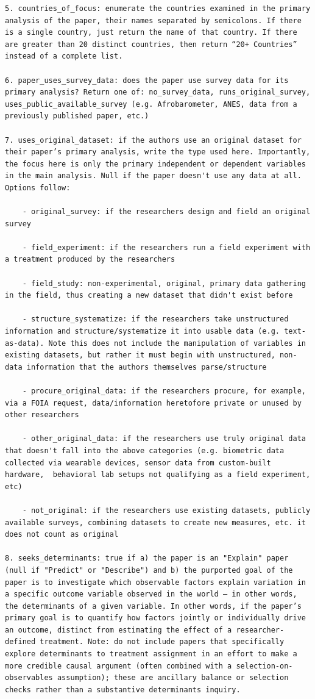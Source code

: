 \documentclass[12pt]{article}
\begin{document}
{\begin{Verbatim}[breaklines=true]
5. countries_of_focus: enumerate the countries examined in the primary analysis of the paper, their names separated by semicolons. If there is a single country, just return the name of that country. If there are greater than 20 distinct countries, then return “20+ Countries” instead of a complete list.

6. paper_uses_survey_data: does the paper use survey data for its primary analysis? Return one of: no_survey_data, runs_original_survey, uses_public_available_survey (e.g. Afrobarometer, ANES, data from a previously published paper, etc.)

7. uses_original_dataset: if the authors use an original dataset for their paper’s primary analysis, write the type used here. Importantly, the focus here is only the primary independent or dependent variables in the main analysis. Null if the paper doesn't use any data at all. Options follow:

    - original_survey: if the researchers design and field an original survey

    - field_experiment: if the researchers run a field experiment with a treatment produced by the researchers

    - field_study: non-experimental, original, primary data gathering in the field, thus creating a new dataset that didn't exist before

    - structure_systematize: if the researchers take unstructured information and structure/systematize it into usable data (e.g. text-as-data). Note this does not include the manipulation of variables in existing datasets, but rather it must begin with unstructured, non-data information that the authors themselves parse/structure

    - procure_original_data: if the researchers procure, for example, via a FOIA request, data/information heretofore private or unused by other researchers

    - other_original_data: if the researchers use truly original data that doesn't fall into the above categories (e.g. biometric data collected via wearable devices, sensor data from custom-built hardware,  behavioral lab setups not qualifying as a field experiment, etc)

    - not_original: if the researchers use existing datasets, publicly available surveys, combining datasets to create new measures, etc. it does not count as original

8. seeks_determinants: true if a) the paper is an "Explain" paper (null if "Predict" or "Describe") and b) the purported goal of the paper is to investigate which observable factors explain variation in a specific outcome variable observed in the world — in other words, the determinants of a given variable. In other words, if the paper’s primary goal is to quantify how factors jointly or individually drive an outcome, distinct from estimating the effect of a researcher‐defined treatment. Note: do not include papers that specifically explore determinants to treatment assignment in an effort to make a more credible causal argument (often combined with a selection-on-observables assumption); these are ancillary balance or selection checks rather than a substantive determinants inquiry.


\end{Verbatim}}
\end{document}
